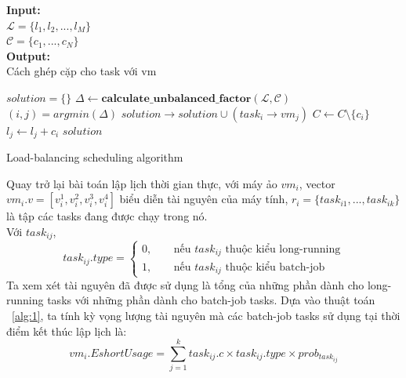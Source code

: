 \documentclass{my_style}
\begin{document}
\begin{algorithm}[H]
\textbf{Input:} \\
$\mathcal{L} = \{l_{1}, l_{2}, ..., l_{M}\}$\\
$\mathcal{C} = \{c_{1}, ..., c_{N}\}$ \\ 
\textbf{Output:} \\
Cách ghép cặp cho task với vm
\begin{algorithmic}[1]
	\STATE $solution = \{\}$
		\STATE $\Delta \leftarrow \textbf{calculate\_unbalanced\_factor}(\mathcal{L}, \mathcal{C})$
		\STATE $(i, j) = argmin(\Delta)$
		\STATE $solution \rightarrow solution \cup (task_{i} \rightarrow vm_{j})$
		\STATE $C \leftarrow C \setminus \{c_{i}\}$
		\STATE $l_{j} \leftarrow l_{j} + c_{i}$
	\ENDWHILE
	\RETURN $solution$
\end{algorithmic}
\caption{Load-balancing scheduling algorithm}
\label{alg:2}
\end{algorithm}

\noindent
Quay trở lại bài toán lập lịch thời gian thực, với máy ảo $vm_{i}$, vector $vm_{i}.v = [v_{i}^{1}, v_{i}^{2}, v_{i}^{3}, v_{i}^{4}]$ biểu diễn tài nguyên của máy tính, $r_{i} = \{task_{i1}, ..., task_{ik}\}$ là tập các tasks đang được chạy trong nó.\\
Với $task_{ij}$, 
\[
task_{ij}.type = 
	\begin{cases}
		\text{0, } &\quad\text{nếu $task_{ij}$ thuộc kiểu long-running} \\
		\text{1, } &\quad\text{nếu $task_{ij}$ thuộc kiểu batch-job}
	\end{cases}
\]
Ta xem xét tài nguyên đã được sử dụng là tổng của những phần dành cho long-running tasks với những phần dành cho batch-job tasks. Dựa vào thuật toán ~\ref{alg:1}, ta tính kỳ vọng lượng tài nguyên mà các batch-job tasks sử dụng tại thời điểm kết thúc lập lịch là: 
\begin{equation}
	vm_{i}.EshortUsage = \sum_{j=1}^{k}task_{ij}.c \times task_{ij}.type \times prob_{task_{ij}}
\end{equation}
\end{document}
